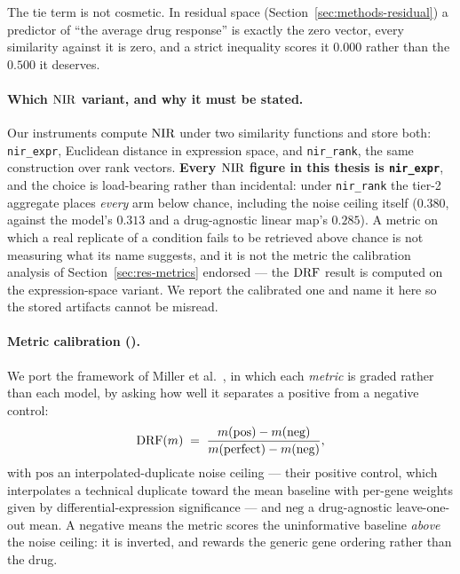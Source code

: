The tie term is not cosmetic. In residual space (Section~\ref{sec:methods-residual}) a predictor of
``the average drug response'' is exactly the zero vector, every similarity against it is zero, and a
strict inequality scores it $0.000$ rather than the $0.500$ it deserves.

\paragraph{Which $\textrm{NIR}$ variant, and why it must be stated.} Our instruments compute $\textrm{NIR}$ under
two similarity functions and store both: \texttt{nir\_expr}, Euclidean distance in expression space,
and \texttt{nir\_rank}, the same construction over rank vectors. \textbf{Every $\textrm{NIR}$ figure in this
thesis is \texttt{nir\_expr}}, and the choice is load-bearing rather than incidental: under
\texttt{nir\_rank} the tier-2 aggregate places \emph{every} arm below chance, including the noise
ceiling itself ($0.380$, against the model's $0.313$ and a drug-agnostic linear map's $0.285$). A
metric on which a real replicate of a condition fails to be retrieved above chance is not measuring
what its name suggests, and it is not the metric the calibration analysis of
Section~\ref{sec:res-metrics} endorsed --- the $\textrm{DRF}$ result is computed on the expression-space
variant. We report the calibrated one and name it here so the stored artifacts cannot be misread.



\paragraph{Metric calibration (\DRF).} We port the framework of Miller et al.~\cite{miller}, in
which each \emph{metric} is graded rather than each model, by asking how well it separates a
positive from a negative control:
\begin{equation}
  \textrm{DRF}(m) \;=\; \frac{m(\textrm{pos}) - m(\textrm{neg})}{m(\textrm{perfect}) - m(\textrm{neg})},
\end{equation}
with $\textrm{pos}$ an interpolated-duplicate noise ceiling --- their positive control, which
interpolates a technical duplicate toward the mean baseline with per-gene weights given by
differential-expression significance --- and $\textrm{neg}$ a drug-agnostic leave-one-out mean. A
negative \DRF{} means the metric scores the uninformative baseline \emph{above} the noise ceiling:
it is inverted, and rewards the generic gene ordering rather than the drug.

